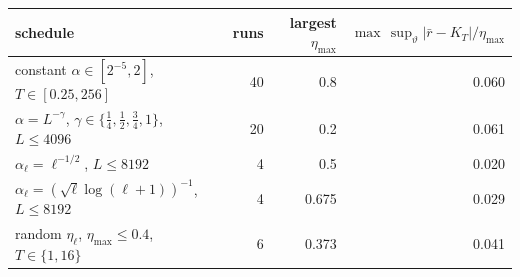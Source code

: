 \begin{tabular}{@{}lrrr@{}}
\toprule
schedule & runs & largest $\eta_{\max}$ & $\max\,\sup_\vartheta|\bar r-K_T|/\eta_{\max}$ \\
\midrule
constant $\alpha\in[2^{-5},2]$, $T\in[0.25,256]$ & 40 & 0.8 & 0.060 \\
$\alpha=L^{-\gamma}$, $\gamma\in\{\frac14,\frac12,\frac34,1\}$, $L\le4096$ & 20 & 0.2 & 0.061 \\
$\alpha_\ell=\ell^{-1/2}$, $L\le8192$ & 4 & 0.5 & 0.020 \\
$\alpha_\ell=(\sqrt\ell\log(\ell+1))^{-1}$, $L\le8192$ & 4 & 0.675 & 0.029 \\
random $\eta_\ell$, $\eta_{\max}\le0.4$, $T\in\{1,16\}$ & 6 & 0.373 & 0.041 \\
\bottomrule
\end{tabular}
